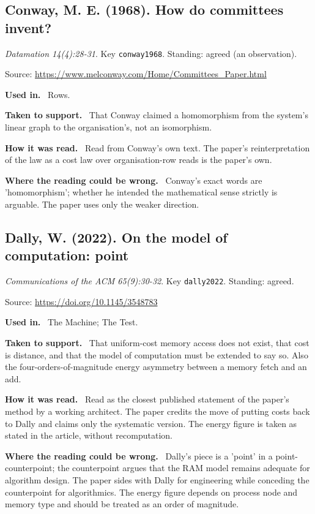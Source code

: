 \documentclass[11pt,oneside]{article}
\newcommand{\field}[1]{\par\noindent\textbf{\color{accent}#1.}\ }
\begin{document}
\subsection*{Conway, M. E. (1968). How do committees invent?}
\noindent\small\emph{Datamation 14(4):28-31}. Key \texttt{conway1968}. Standing: agreed (an observation).
\par\noindent\small Source: \url{https://www.melconway.com/Home/Committees_Paper.html}
\normalsize
\field{Used in} Rows.
\field{Taken to support} That Conway claimed a homomorphism from the system's linear graph to the organisation's, not an isomorphism.
\field{How it was read} Read from Conway's own text. The paper's reinterpretation of the law as a cost law over organisation-row reads is the paper's own.
\field{Where the reading could be wrong} Conway's exact words are 'homomorphism'; whether he intended the mathematical sense strictly is arguable. The paper uses only the weaker direction.

\hypertarget{src:dally2022}{}
\subsection*{Dally, W. (2022). On the model of computation: point}
\noindent\small\emph{Communications of the ACM 65(9):30-32}. Key \texttt{dally2022}. Standing: agreed.
\par\noindent\small Source: \url{https://doi.org/10.1145/3548783}
\normalsize
\field{Used in} The Machine; The Test.
\field{Taken to support} That uniform-cost memory access does not exist, that cost is distance, and that the model of computation must be extended to say so. Also the four-orders-of-magnitude energy asymmetry between a memory fetch and an add.
\field{How it was read} Read as the closest published statement of the paper's method by a working architect. The paper credits the move of putting costs back to Dally and claims only the systematic version. The energy figure is taken as stated in the article, without recomputation.
\field{Where the reading could be wrong} Dally's piece is a 'point' in a point-counterpoint; the counterpoint argues that the RAM model remains adequate for algorithm design. The paper sides with Dally for engineering while conceding the counterpoint for algorithmics. The energy figure depends on process node and memory type and should be treated as an order of magnitude.

\hypertarget{src:david1985}{}
\end{document}
